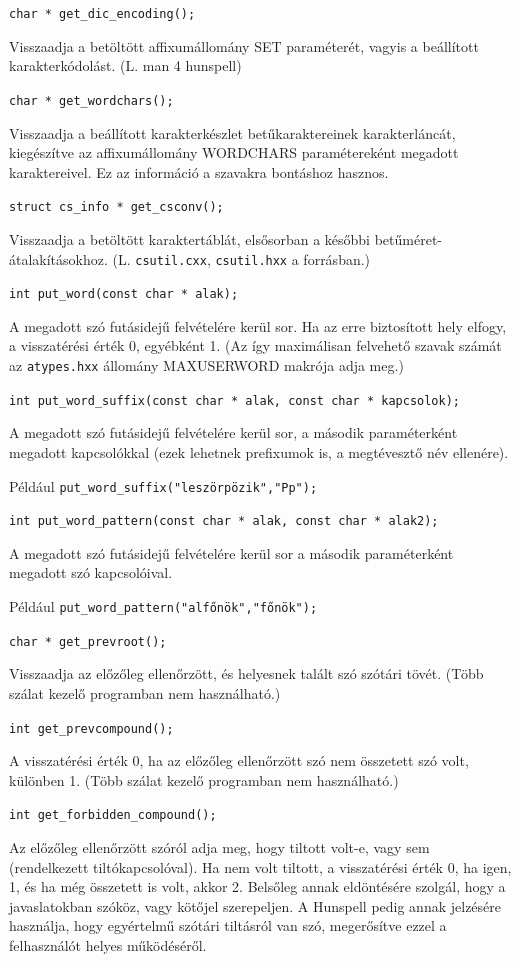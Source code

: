 \noindent\verb+char * get_dic_encoding();+

Visszaadja a betöltött affixumállomány SET paraméterét,
vagyis a beállított karakterkódolást.
(L. man 4 hunspell)

\noindent\verb+char * get_wordchars();+

Visszaadja a beállított karakterkészlet
betűkaraktereinek karakterláncát, kiegészítve
az affixumállomány WORDCHARS paramétereként
megadott karaktereivel. Ez az információ
a szavakra bontáshoz hasznos.

\noindent\verb+struct cs_info * get_csconv();+

Visszaadja a betöltött karaktertáblát, elsősorban
a későbbi betűméret-átalakításokhoz.
(L. \texttt{csutil.cxx}, \texttt{csutil.hxx} a forrásban.)

\noindent\verb+int put_word(const char * alak);+

A megadott szó futásidejű felvételére kerül sor.
Ha az erre biztosított hely elfogy, a visszatérési érték 0,
egyébként 1. (Az így maximálisan felvehető szavak számát
az \texttt{atypes.hxx} állomány MAXUSERWORD makrója adja meg.)

\noindent\verb+int put_word_suffix(const char * alak, const char * kapcsolok);+

A megadott szó futásidejű felvételére kerül sor, a második
paraméterként megadott kapcsolókkal (ezek lehetnek prefixumok is, a
megtévesztő név ellenére).

Például \verb+put_word_suffix("leszörpözik","Pp");+

\noindent\verb+int put_word_pattern(const char * alak, const char * alak2);+

A megadott szó futásidejű felvételére kerül sor a második
paraméterként megadott szó kapcsolóival.

Például \verb+put_word_pattern("alfőnök","főnök");+

\noindent\verb+char * get_prevroot();+

Visszaadja az előzőleg ellenőrzött, és helyesnek
talált szó szótári tövét.
(Több szálat kezelő programban nem használható.)

\noindent\verb+int get_prevcompound();+

A visszatérési érték 0, ha az előzőleg
ellenőrzött szó nem összetett szó volt, különben 1.
(Több szálat kezelő programban nem használható.)

\noindent\verb+int get_forbidden_compound();+

Az előzőleg ellenőrzött szóról adja meg,
hogy tiltott volt-e, vagy sem (rendelkezett
tiltókapcsolóval). Ha nem volt tiltott,
a visszatérési érték 0, ha igen, 1, és
ha még összetett is volt, akkor 2.
Belsőleg annak eldöntésére szolgál, hogy
a javaslatokban szóköz, vagy kötőjel szerepeljen.
A Hunspell pedig annak jelzésére használja, hogy
egyértelmű szótári tiltásról van szó, megerősítve
ezzel a felhasználót helyes működéséről.


